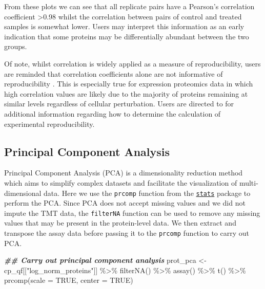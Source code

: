 \documentclass[9pt,a4paper,]{extarticle}
\newenvironment{Shaded}{\begin{snugshade}}{\end{snugshade}}
\newcommand{\AttributeTok}[1]{\textcolor[rgb]{0.77,0.63,0.00}{#1}}
\newcommand{\ConstantTok}[1]{\textcolor[rgb]{0.00,0.00,0.00}{#1}}
\newcommand{\DocumentationTok}[1]{\textcolor[rgb]{0.56,0.35,0.01}{\textbf{\textit{#1}}}}
\newcommand{\FunctionTok}[1]{\textcolor[rgb]{0.00,0.00,0.00}{#1}}
\newcommand{\NormalTok}[1]{#1}
\newcommand{\OtherTok}[1]{\textcolor[rgb]{0.56,0.35,0.01}{#1}}
\newcommand{\SpecialCharTok}[1]{\textcolor[rgb]{0.00,0.00,0.00}{#1}}
\newcommand{\StringTok}[1]{\textcolor[rgb]{0.31,0.60,0.02}{#1}}
\begin{document}
From these plots we can see that all replicate pairs have a Pearson's correlation
coefficient \textgreater0.98 whilst the correlation between pairs of control and treated
samples is somewhat lower. Users may interpret this information as an early
indication that some proteins may be differentially abundant between the two
groups.

Of note, whilst correlation is widely applied as a measure of reproducibility,
users are reminded that correlation coefficients alone are not informative of
reproducibility \citep{simply_stats, Bunting2019}. This is especially true for
expression proteomics data in which high correlation values are likely due to
the majority of proteins remaining at similar levels regardless of cellular
perturbation. Users are directed to \citep{Darbani2014} for additional information
regarding how to determine the calculation of experimental reproducibility.

\hypertarget{principal-component-analysis}{%
\subsection{Principal Component Analysis}\label{principal-component-analysis}}

Principal Component Analysis (PCA) is a dimensionality reduction method which
aims to simplify complex datasets and facilitate the visualization of
multi-dimensional data. Here we use the \texttt{prcomp} function from the
\href{https://stat.ethz.ch/R-manual/R-devel/library/stats/html/00Index.html}{\texttt{stats}}
package to perform the PCA. Since PCA does not accept missing values and we did
not impute the TMT data, the \texttt{filterNA} function can be used to remove any
missing values that may be present in the protein-level data. We then extract
and transpose the assay data before passing it to the \texttt{prcomp} function to carry
out PCA.

\begin{Shaded}
\begin{Highlighting}[]
\DocumentationTok{\#\# Carry out principal component analysis}
\NormalTok{prot\_pca }\OtherTok{\textless{}{-}}\NormalTok{ cp\_qf[[}\StringTok{"log\_norm\_proteins"}\NormalTok{]] }\SpecialCharTok{\%\textgreater{}\%}
  \FunctionTok{filterNA}\NormalTok{() }\SpecialCharTok{\%\textgreater{}\%}
  \FunctionTok{assay}\NormalTok{() }\SpecialCharTok{\%\textgreater{}\%}
  \FunctionTok{t}\NormalTok{() }\SpecialCharTok{\%\textgreater{}\%}
  \FunctionTok{prcomp}\NormalTok{(}\AttributeTok{scale =} \ConstantTok{TRUE}\NormalTok{, }\AttributeTok{center =} \ConstantTok{TRUE}\NormalTok{)}
\end{Highlighting}
\end{Shaded}
\end{document}
